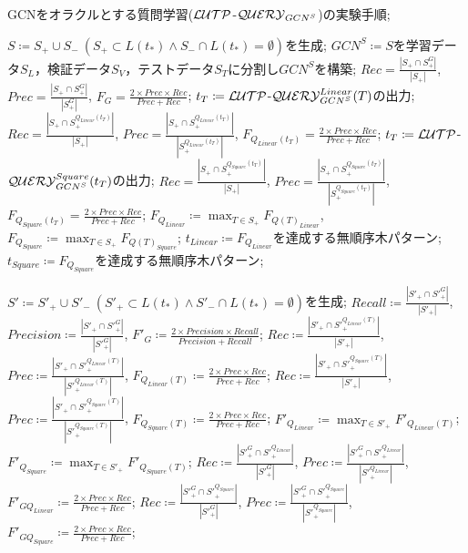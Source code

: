 \begin{algorithm}[tb]
\caption{GCNをオラクルとする質問学習(${\cal LUTP}$-${\cal QUERY}_{GCN^S}$)の実験手順;} \label{alg:exp_ql-gcn}
\begin{algorithmic}[1]
  \State $S\coloneqq S_+\cup S_-~(S_+\subset L(t_{\ast})\land S_-\cap L(t_{\ast})=\emptyset)$を生成;
  \State $GCN^S\coloneqq S$を学習データ$S_L$，検証データ$S_V$，テストデータ$S_T$に分割し$GCN^S$を構築;
  \State $Rec=\frac{|{S}_+\cap {S}_+^G|}{|{S}_+|}$,
      $Prec=\frac{|{S}_+\cap {S}_+^G|}{|{S}_+^G|}$,
      $F_G=\frac{2\times Prec\times Rec}{Prec+Rec}$;
    \State $t_T\coloneqq {\cal LUTP}$-${\cal QUERY}_{GCN^S}^{Linear}(T)$の出力;
    \State $Rec=\frac{|S_+\cap S_{+}^{Q_{Linear}(t_T)}|}{|S_+|}$,
    $Prec=\frac{|S_+\cap S_{+}^{Q_{Linear}(t_T)}|}{|S_{+}^{Q_{Linear}(t_T)}|}$,
    $F_{Q_{Linear}(t_T)}=\frac{2\times Prec\times Rec}{Prec+Rec}$;
    \State $t_T\coloneqq {\cal LUTP}$-${\cal QUERY}_{GCN^S}^{Square}(t_T)$の出力;
    \State $Rec=\frac{|S_+\cap S_{+}^{Q_{Square}(t_T)}|}{|S_+|}$,
    $Prec=\frac{|S_+\cap S_{+}^{Q_{Square}(t_T)}|}{|S_{+}^{Q_{Square}(t_T)}|}$,
    $F_{Q_{Square}(t_T)}=\frac{2\times Prec\times Rec}{Prec+Rec}$;
  \EndFor
  \State $F_{Q_{Linear}}\coloneqq \max_{T\in S_+}F_{Q(T)_{Linear}}$, $F_{Q_{Square}}\coloneqq \max_{T\in S_+}F_{Q(T)_{Square}}$;
  \State $t_{Linear}\coloneqq F_{Q_{Linear}}$を達成する無順序木パターン;
  \State $t_{Square}\coloneqq F_{Q_{Square}}$を達成する無順序木パターン;

  \State $S'\coloneqq S'_+\cup S'_-~(S'_+\subset L(t_{\ast})\land S'_-\cap L(t_{\ast})=\emptyset)$を生成;
  \State $Recall\coloneqq\frac{|{S'}_+\cap {S'}_+^G|}{|{S'}_+|}$,
      $Precision\coloneqq\frac{|{S'}_+\cap {S'}_+^G|}{|{S'}_+^G|}$,
      $F'_G\coloneqq\frac{2\times Precision\times Recall}{Precision+Recall}$;
      \State $Rec\coloneqq\frac{|{S'}_+\cap {S'}_{+}^{Q_{Linear}(T)}|}{|{S'}_+|}$,
      $Prec\coloneqq\frac{|{S'}_+\cap {S'}_{+}^{Q_{Linear}(T)}|}{|{S'}_{+}^{Q_{Linear}(T)}|}$,
      $F_{Q_{Linear}(T)}\coloneqq\frac{2\times Prec\times Rec}{Prec+Rec}$;
      \State $Rec\coloneqq\frac{|{S'}_+\cap {S'}_{+}^{Q_{Square}(T)}|}{|{S'}_+|}$,
      $Prec\coloneqq\frac{|{S'}_+\cap {S'}_{+}^{Q_{Square}(T)}|}{|{S'}_{+}^{Q_{Square}(T)}|}$,
      $F_{Q_{Square}(T)}\coloneqq\frac{2\times Prec\times Rec}{Prec+Rec}$;
    \EndFor
  \State ${F'}_{Q_{Linear}}\coloneqq\max_{T\in {S'}_+}{F'}_{Q_{Linear}(T)}$;
  \State ${F'}_{Q_{Square}}\coloneqq\max_{T\in {S'}_+}{F'}_{Q_{Square}(T)}$;
  \State $Rec\coloneqq\frac{|{S'}_+^G\cap {S'}_+^{Q_{Linear}}|}{|{S'}_+^G|}$,
  $Prec\coloneqq\frac{|{S'}_+^G\cap {S'}_+^{Q_{Linear}}|}{|{S'}_+^{Q_{Linear}}|}$,
  $F'_{GQ_{Linear}}\coloneqq\frac{2\times Prec\times Rec}{Prec+Rec}$;
  \State $Rec\coloneqq\frac{|{S'}_+^G\cap {S'}_+^{Q_{Square}}|}{|{S'}_+^G|}$,
  $Prec\coloneqq\frac{|{S'}_+^G\cap {S'}_+^{Q_{Square}}|}{|{S'}_+^{Q_{Square}}|}$,
  $F'_{GQ_{Square}}\coloneqq\frac{2\times Prec\times Rec}{Prec+Rec}$;
\end{algorithmic}
\end{algorithm}

